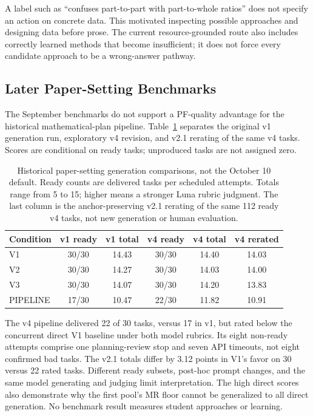 A label such as ``confuses part-to-part with part-to-whole ratios'' does not specify an action on concrete data. This motivated inspecting possible approaches and designing data before prose. The current resource-grounded route also includes correctly learned methods that become insufficient; it does not force every candidate approach to be a wrong-answer pathway.

\subsection{Later Paper-Setting Benchmarks}

The September benchmarks do not support a PF-quality advantage for the historical mathematical-plan pipeline. Table~\ref{tab:paper-benchmark} separates the original v1 generation run, exploratory v4 revision, and v2.1 rerating of the same v4 tasks. Scores are conditional on ready tasks; unproduced tasks are not assigned zero.

\begin{table}[h]
\centering
\small
\begin{tabular}{@{}lccccc@{}}
\toprule
\textbf{Condition} & \textbf{v1 ready} & \textbf{v1 total} & \textbf{v4 ready} & \textbf{v4 total} & \textbf{v4 rerated} \\
\midrule
V1       & 30/30 & 14.43 & 30/30 & 14.40 & 14.03 \\
V2       & 30/30 & 14.27 & 30/30 & 14.03 & 14.00 \\
V3       & 30/30 & 14.07 & 30/30 & 14.20 & 13.83 \\
PIPELINE & 17/30 & 10.47 & 22/30 & 11.82 & 10.91 \\
\bottomrule
\end{tabular}
\caption{Historical paper-setting generation comparisons, not the October 10 default. Ready counts are delivered tasks per scheduled attempts. Totals range from 5 to 15; higher means a stronger Luna rubric judgment. The last column is the anchor-preserving v2.1 rerating of the same 112 ready v4 tasks, not new generation or human evaluation.}
\label{tab:paper-benchmark}
\end{table}

The v4 pipeline delivered 22 of 30 tasks, versus 17 in v1, but rated below the concurrent direct V1 baseline under both model rubrics. Its eight non-ready attempts comprise one planning-review stop and seven API timeouts, not eight confirmed bad tasks. The v2.1 totals differ by 3.12 points in V1's favor on 30 versus 22 rated tasks. Different ready subsets, post-hoc prompt changes, and the same model generating and judging limit interpretation. The high direct scores also demonstrate why the first pool's MR floor cannot be generalized to all direct generation. No benchmark result measures student approaches or learning.

